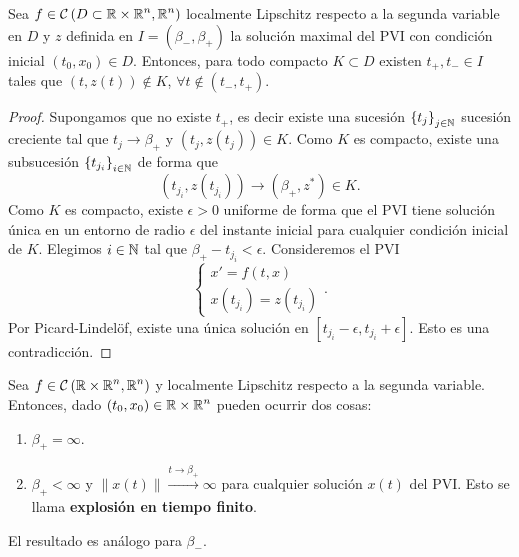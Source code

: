 \begin{theorem}
Sea $\displaystyle f \in \mathcal{C}\left(D \subset \mathbb{R} \times \mathbb{R}^{n}, \mathbb{R}^{n}\right) $ localmente Lipschitz respecto a la segunda variable en $\displaystyle D $ y $\displaystyle z $ definida en $\displaystyle I=\left(\beta_{-}, \beta_{+ }\right) $ la solución maximal del PVI con condición inicial $\displaystyle \left(t_{0}, x_{0}\right)\in D $. Entonces, para todo compacto $\displaystyle K \subset D $ existen $\displaystyle t_{+}, t_{-} \in I $ tales que $\displaystyle \left(t, z\left(t\right)\right)\not\in K $, $\displaystyle \forall t \not\in\left(t_{-}, t_{+}\right) $. 
\end{theorem}
\begin{proof}
	Supongamos que no existe $\displaystyle t_{+} $, es decir existe una sucesión $\displaystyle \left\{ t_{j}\right\} _{j \in \mathbb{N}} $ sucesión creciente tal que $\displaystyle t_{j}\to \beta_{+} $ y $\displaystyle \left(t_{j}, z\left(t_{j}\right)\right)\in K $. 
	Como $\displaystyle K $ es compacto, existe una subsucesión $\displaystyle \left\{ t_{j_{i}}\right\} _{i \in \mathbb{N}} $ de forma que 
	\[\left(t_{j_{i}}, z\left(t_{j_{i}}\right)\right)\to\left(\beta_{+}, z^{*}\right)\in K .\]
Como $\displaystyle K $ es compacto, existe $\displaystyle \epsilon > 0 $ uniforme de forma que el PVI tiene solución única en un entorno de radio $\displaystyle \epsilon  $ del instante inicial para cualquier condición inicial de $\displaystyle K $. Elegimos $\displaystyle i \in \mathbb{N} $ tal que $\displaystyle \beta_{+}-t_{j_{i}}<\epsilon  $. Consideremos el PVI
\[
\begin{cases}
x' = f\left(t,x\right) \\
x\left(t_{j_{i}}\right)=z\left(t_{j_{i}}\right)
\end{cases}
.\]
Por Picard-Lindelöf, existe una única solución en $\displaystyle \left[t_{j_{i}}-\epsilon, t_{j_{i}}+\epsilon \right]  $. Esto es una contradicción.
\end{proof}
\begin{colorary}
Sea $\displaystyle f \in \mathcal{C}\left(\mathbb{R} \times \mathbb{R}^{n} , \mathbb{R}^{n}\right) $ y localmente Lipschitz respecto a la segunda variable. Entonces, dado $\displaystyle \left(t_{0}, x_{0}\right)\in \mathbb{R}\times\mathbb{R}^{n} $ pueden ocurrir dos cosas:
\begin{enumerate}
\item $\displaystyle \beta_{+}=\infty $.
\item $\displaystyle \beta_{+}<\infty $ y $\displaystyle \|x\left(t\right)\| \xrightarrow{t \to \beta_{+ }} \infty$ para cualquier solución $\displaystyle x\left(t\right) $ del PVI. Esto se llama \textbf{explosión en tiempo finito}.
\end{enumerate}
El resultado es análogo para $\displaystyle \beta_{-} $.
\end{colorary}
